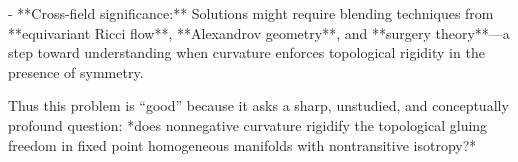 - **Cross-field significance:** Solutions might require blending techniques from **equivariant Ricci flow**, **Alexandrov geometry**, and **surgery theory**—a step toward understanding when curvature enforces topological rigidity in the presence of symmetry.  

Thus this problem is “good” because it asks a sharp, unstudied, and conceptually profound question: *does nonnegative curvature rigidify the topological gluing freedom in fixed point homogeneous manifolds with nontransitive isotropy?*